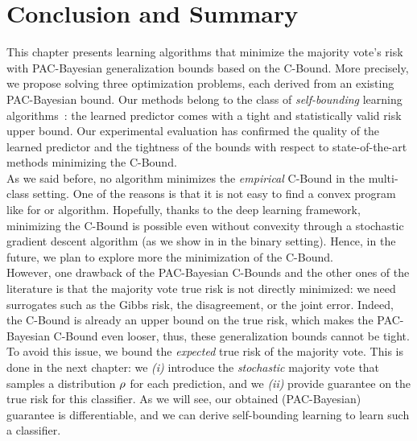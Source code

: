 \section{Conclusion and Summary}

This chapter presents learning algorithms that minimize the majority vote's risk with PAC-Bayesian generalization bounds based on the C-Bound. 
More precisely, we propose solving three optimization problems, each derived from an existing PAC-Bayesian bound.
Our methods belong to the class of {\it self-bounding} learning algorithms~\citep{Freund1998}: the learned predictor comes with a tight and statistically valid risk upper bound.
Our experimental evaluation has confirmed the quality of the learned predictor and the tightness of the bounds with respect to state-of-the-art methods minimizing the C-Bound.\\

As we said before, no algorithm minimizes the {\it empirical} C-Bound in the multi-class setting.
One of the reasons is that it is not easy to find a convex program like for \mincq or \pmincq algorithm.
Hopefully, thanks to the deep learning framework, minimizing the C-Bound is possible even without convexity through a stochastic gradient descent algorithm (as we show in  in the binary setting).
Hence, in the future, we plan to explore more the minimization of the C-Bound.\\

However, one drawback of the PAC-Bayesian C-Bounds and the other ones of the literature is that the majority vote true risk is not directly minimized: we need surrogates such as the Gibbs risk, the disagreement, or the joint error.
Indeed, the C-Bound is already an upper bound on the true risk, which makes the PAC-Bayesian C-Bound even looser, thus, these generalization bounds cannot be tight.
To avoid this issue, we bound the {\it expected} true risk of the majority vote.
This is done in the next chapter: we {\it (i)} introduce the {\it stochastic} majority vote that samples a distribution $\rho$ for each prediction, and we {\it (ii)} provide guarantee on the true risk for this classifier.
As we will see, our obtained (PAC-Bayesian) guarantee is differentiable, and we can derive self-bounding learning to learn such a classifier.
